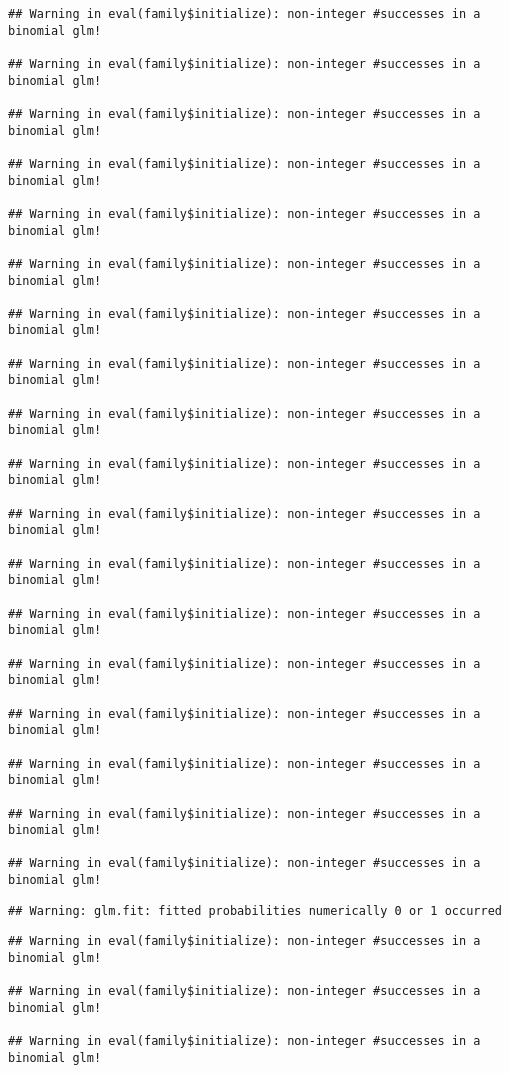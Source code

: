 \documentclass[
]{article}
\begin{document}
\begin{verbatim}
## Warning in eval(family$initialize): non-integer #successes in a binomial glm!

## Warning in eval(family$initialize): non-integer #successes in a binomial glm!

## Warning in eval(family$initialize): non-integer #successes in a binomial glm!

## Warning in eval(family$initialize): non-integer #successes in a binomial glm!

## Warning in eval(family$initialize): non-integer #successes in a binomial glm!

## Warning in eval(family$initialize): non-integer #successes in a binomial glm!

## Warning in eval(family$initialize): non-integer #successes in a binomial glm!

## Warning in eval(family$initialize): non-integer #successes in a binomial glm!

## Warning in eval(family$initialize): non-integer #successes in a binomial glm!

## Warning in eval(family$initialize): non-integer #successes in a binomial glm!

## Warning in eval(family$initialize): non-integer #successes in a binomial glm!

## Warning in eval(family$initialize): non-integer #successes in a binomial glm!

## Warning in eval(family$initialize): non-integer #successes in a binomial glm!

## Warning in eval(family$initialize): non-integer #successes in a binomial glm!

## Warning in eval(family$initialize): non-integer #successes in a binomial glm!

## Warning in eval(family$initialize): non-integer #successes in a binomial glm!

## Warning in eval(family$initialize): non-integer #successes in a binomial glm!

## Warning in eval(family$initialize): non-integer #successes in a binomial glm!
\end{verbatim}

\begin{verbatim}
## Warning: glm.fit: fitted probabilities numerically 0 or 1 occurred
\end{verbatim}

\begin{verbatim}
## Warning in eval(family$initialize): non-integer #successes in a binomial glm!

## Warning in eval(family$initialize): non-integer #successes in a binomial glm!

## Warning in eval(family$initialize): non-integer #successes in a binomial glm!
\end{verbatim}
\end{document}
